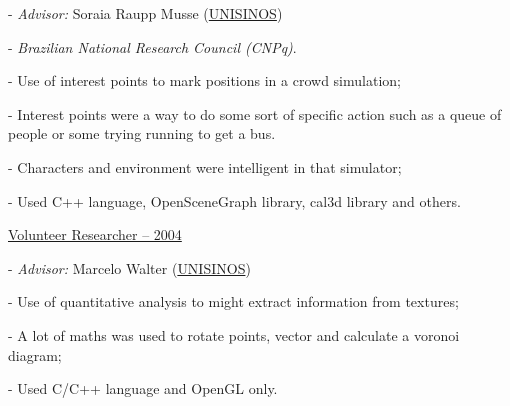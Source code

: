 \documentclass[12pt,oneside,a4paper]{article}
\begin{document}
\begin{compactitem}
    \begin{compactitem}
		  \item [-] \textit{Advisor:} Soraia Raupp Musse (\href{http://www.unisinos.br}{UNISINOS})
	    \item [-] \textit{Brazilian National Research Council (CNPq)}.
      \item [-] Use of interest points to mark positions in a crowd simulation;
      \item [-] Interest points were a way to do some sort of specific action such as a queue of
      \\ people or some trying running to get a bus.
      \item [-] Characters and environment were intelligent in that simulator;
      \item [-] Used C++ language, OpenSceneGraph library, cal3d library and others.
    \end{compactitem}
	\item \underline{Volunteer Researcher – 2004}
    \begin{compactitem}
      \item [-] \textit{Advisor:} Marcelo Walter (\href{http://www.unisinos.br}{UNISINOS})
      \item [-] Use of quantitative analysis to might extract information from textures;
      \item [-] A lot of maths was used to rotate points, vector and calculate a voronoi diagram;
      \item [-] Used C/C++ language and OpenGL only.
    \end{compactitem}
\end{compactitem}
\end{document}
